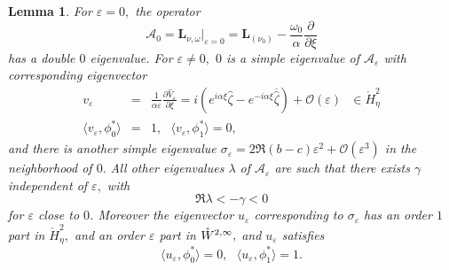 \documentclass[11pt]{article}
\newtheorem{lemma}[theorem]{Lemma}
\begin{document}
\begin{lemma}
For $\varepsilon =0,$ the operator%
\begin{equation*}
\mathcal{A}_0 = \boldsymbol{L}_{\nu ,\omega }|_{\varepsilon =0}=\boldsymbol{L}_{(\nu_0)}-\frac{\omega
_{0}}{\alpha }\frac{\partial }{\partial \xi }
\end{equation*}%
has a double $0$ eigenvalue. For $\varepsilon \neq 0,$ $0$ is a simple
eigenvalue of $\mathcal{A}_\varepsilon$ with corresponding eigenvector%
\begin{eqnarray*}
v_{\varepsilon } &=&\frac{1}{\alpha \varepsilon }\frac{\partial \widehat{V}%
_{\varepsilon }}{\partial \xi }=i(e^{i\alpha \xi }\widehat{\zeta }%
-e^{-i\alpha \xi }\overline{\widehat{\zeta }})+\mathcal{O}(\varepsilon )%
\text{ }\in \mathring{H}_{\eta}^{2} \\
\langle v_{\varepsilon },\phi _{0}^{\ast }\rangle &=&1,\text{ }\langle
v_{\varepsilon },\phi _{1}^{\ast }\rangle =0,
\end{eqnarray*}%
and there is another simple eigenvalue $\sigma _{\varepsilon
}=2 \Re (b-c)\varepsilon ^{2}+\mathcal{O}(\varepsilon ^{3})$ in the neighborhood
of $0.$ All other eigenvalues $\lambda $ of $\mathcal{A}_\varepsilon$ are such that there exists $\gamma $
independent of $\varepsilon ,$ with%
\begin{equation*}
\Re \lambda <-\gamma <0
\end{equation*}%
for $\varepsilon $ close to $0$. Moreover the eigenvector $u_{\varepsilon }$
corresponding to $\sigma _{\varepsilon }$ has an order $1$ part in $\mathring{H}%
_{\eta}^{2},$ and an order $\varepsilon $ part in $\mathring{%
W}^{2,\infty },$ and $u_{\varepsilon }$ satisfies%
\begin{equation*}
\langle u_{\varepsilon },\phi _{0}^{\ast }\rangle =0,\text{ }\langle
u_{\varepsilon },\phi _{1}^{\ast }\rangle =1.
\end{equation*}
\end{lemma}
\end{document}
